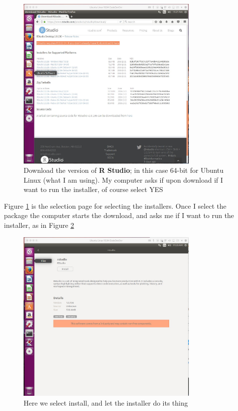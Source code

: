 \begin{figure}[h!] %
   \centering
   \includegraphics[width=3.5in]{./1-Introduction/LinuxRStudioDownload.jpg} 
   \caption{Download the version of \textbf{R Studio}; in this case 64-bit for Ubuntu Linux (what I am using).  
   My computer asks if upon download if I want to run the installer, of course select YES}
   \label{fig:LinuxRStudioDownload}
\end{figure}

\clearpage

Figure \ref{fig:LinuxRStudioDownload} is the selection page for selecting the installers.  
Once I select the package the computer starts the download, and asks me if I want to run the installer, as in Figure \ref{fig:LinuxRStudioInstall}



\begin{figure}[h!] %
   \centering
   \includegraphics[width=3.5in]{./1-Introduction/LinuxRStudioInstall.jpg} 
   \caption{Here we select install, and let the installer do its thing}
   \label{fig:LinuxRStudioInstall}
\end{figure}

